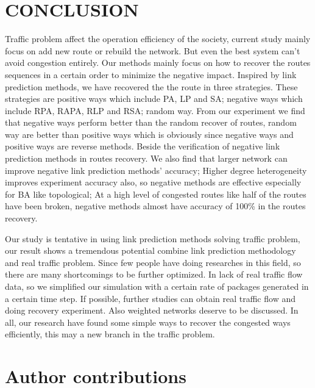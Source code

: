 \documentclass[onecolumn,preprintnumbers,amsmath,amssymb]{revtex4}
\begin{document}
\section*{CONCLUSION}
Traffic  problem affect the operation efficiency of the society, current study mainly focus on add new route or rebuild the network. But even the best system can't avoid congestion  entirely. Our methods mainly focus on how to recover the routes sequences in a certain order to minimize the negative impact. Inspired by link prediction methods, we have recovered the the route in three strategies. These strategies are positive ways which include PA, LP and SA; negative ways which include RPA, RAPA, RLP and RSA; random way. From our experiment we find that negative ways perform better than the random recover of routes, random way are better than positive ways which is obviously since negative ways and positive ways are reverse methods. Beside the verification of negative link prediction methods in routes recovery. We also find that larger network can improve negative link prediction methods' accuracy; Higher degree heterogeneity improves experiment accuracy also, so negative methods are effective especially for BA like topological; At a high level of congested routes like half of the routes have been broken, negative methods almost have accuracy of 100\% in the routes recovery.

Our study is tentative in using link prediction methods solving traffic problem, our result shows a tremendous potential combine link prediction methodology and real traffic problem. Since few people have doing researches in this field, so there are many shortcomings to be further optimized. In lack of real traffic flow data, so we simplified our simulation with a certain rate of packages generated in a certain time step. If possible, further studies can obtain real traffic flow and doing recovery experiment. Also weighted networks deserve to be discussed. In all, our research have found some simple ways to recover the congested ways efficiently, this may a new branch in the traffic problem.

\section*{Author contributions}
\end{document}
